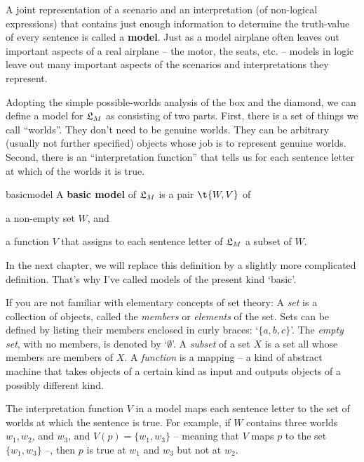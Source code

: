 A joint representation of a scenario and an interpretation (of non-logical
expressions) that contains just enough information to determine the truth-value
of every sentence is called a \textbf{model}. Just as a model airplane often
leaves out important aspects of a real airplane -- the motor, the seats, etc. --
models in logic leave out many important aspects of the scenarios and
interpretations they represent.

Adopting the simple possible-worlds analysis of the box and the diamond, we can
define a model for $\mathfrak{L}_{M}$ as consisting of two parts. First, there is a set of
things we call ``worlds''. They don't need to be genuine worlds. They can be
arbitrary (usually not further specified) objects whose job is to represent
genuine worlds. Second, there is an ``interpretation function'' that tells us
for each sentence letter at which of the worlds it is true.

\begin{definition}{}{basicmodel}
  A \textbf{basic model} of $\mathfrak{L}_M$ is a pair $\t{W,V}$ of%
  \vspace{-3mm}
  \begin{itemize*}
  \item a non-empty set $W$, and
  \item a function $V$ that assigns to each sentence letter of $\mathfrak{L}_M$
  a subset of $W$.
  \end{itemize*}
\end{definition}
\noindent
In the next chapter, we will replace this definition by a slightly more
complicated definition. That's why I've called models of the present kind
`basic'.

If you are not familiar with elementary concepts of set theory: A \emph{set} is
a collection of objects, called the \emph{members} or \emph{elements} of the
set. Sets can be defined by listing their members enclosed in curly braces:
`$\{ a, b, c \}$'. The \emph{empty set}, with no members, is denoted by
`$\emptyset$'. A \emph{subset} of a set $X$ is a set all whose members are
members of $X$. A \emph{function} is a mapping -- a kind of abstract machine
that takes objects of a certain kind as input and outputs objects of a possibly
different kind.

The interpretation function $V$ in a model maps each sentence letter to the set
of worlds at which the sentence is true. For example, if $W$ contains three
worlds $w_{1}, w_{2}$, and $w_{3}$, and $V(p) = \{ w_{1}, w_{3} \}$ -- meaning
that $V$ maps $p$ to the set $\{ w_{1}, w_{3} \}$ --, then $p$ is true at
$w_{1}$ and $w_{3}$ but not at $w_{2}$.

